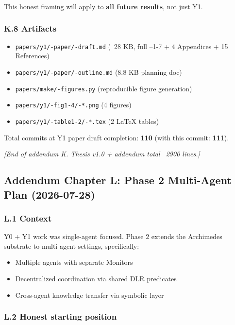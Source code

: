 \documentclass[11pt]{article}
\begin{document}
This honest framing will apply to \textbf{all future results}, not just Y1.

\subsubsection{K.8 Artifacts}

\begin{itemize}
  \item \texttt{papers/y1/-paper/-draft.md} (~28 KB, full --1-7 + 4 Appendices + 15 References)
  \item \texttt{papers/y1/-paper/-outline.md} (8.8 KB planning doc)
  \item \texttt{papers/make/-figures.py} (reproducible figure generation)
  \item \texttt{papers/y1/-fig1-4/-*.png} (4 figures)
  \item \texttt{papers/y1/-table1-2/-*.tex} (2 LaTeX tables)
\end{itemize}


Total commits at Y1 paper draft completion: \textbf{110} (with this commit: \textbf{111}).

\hrulefill

\textit{[End of addendum K. Thesis v1.0 + addendum total ~2900 lines.]}


\hrulefill

\subsection{Addendum Chapter L: Phase 2 Multi-Agent Plan (2026-07-28)}

\subsubsection{L.1 Context}

Y0 + Y1 work was single-agent focused. Phase 2 extends the Archimedes
substrate to multi-agent settings, specifically:

\begin{itemize}
  \item Multiple agents with separate Monitors
  \item Decentralized coordination via shared DLR predicates
  \item Cross-agent knowledge transfer via symbolic layer
\end{itemize}


\subsubsection{L.2 Honest starting position}
\end{document}
